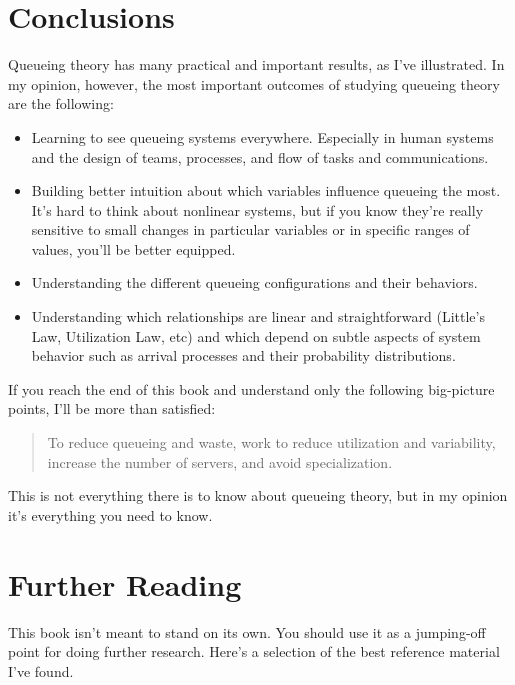 \documentclass{vivid_layout_pdf}
\begin{document}
\section{Conclusions}
Queueing theory has many practical and important results, as I've
illustrated. In my opinion, however, the most important outcomes of
studying queueing theory are the following:
\begin{itemize}
\item Learning to see queueing systems everywhere. Especially in human systems and the design of teams, processes, and flow of tasks and communications.
\item Building better intuition about which variables influence queueing the most. It's hard to think about nonlinear systems, but if you know they're really sensitive to small changes in particular variables or in specific ranges of values, you'll be better equipped.
\item Understanding the different queueing configurations and their behaviors.
\item Understanding which relationships are linear and straightforward (Little's Law, Utilization Law, etc) and which depend on subtle aspects of system behavior such as arrival processes and their probability distributions.
\end{itemize}
If you reach the end of this book and understand only the following big-picture points, I'll be more than satisfied:
\begin{quote}	%
To reduce queueing and waste, work to reduce utilization and variability, increase the number of servers, and avoid specialization.
\end{quote}
This is not everything there is to know about queueing theory, but in my opinion it's everything you need to know.

\section{Further Reading}

This book isn't meant to stand on its own. You should use it as a jumping-off
point for doing further research. Here's a selection of the best reference
material I've found.
\end{document}
